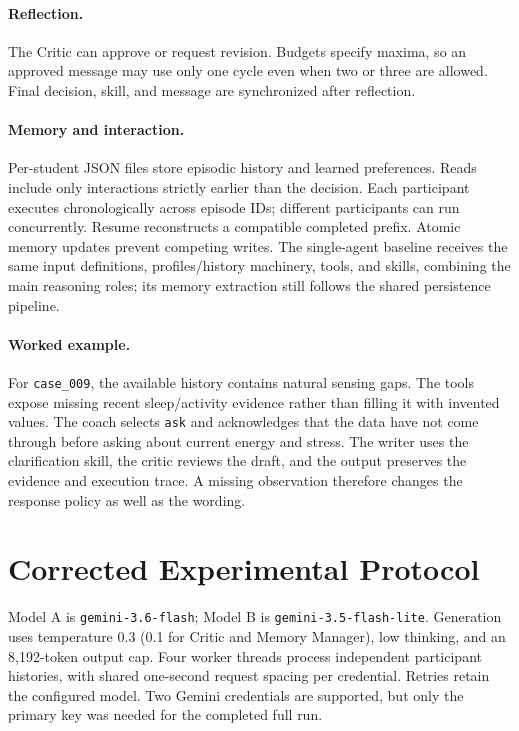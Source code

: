 \documentclass{article}
\begin{document}
\paragraph{Reflection.} The Critic can approve or request revision. Budgets specify maxima, so an approved message may use only one cycle even when two or three are allowed. Final decision, skill, and message are synchronized after reflection.
\paragraph{Memory and interaction.} Per-student JSON files store episodic history and learned preferences. Reads include only interactions strictly earlier than the decision. Each participant executes chronologically across episode IDs; different participants can run concurrently. Resume reconstructs a compatible completed prefix. Atomic memory updates prevent competing writes. The single-agent baseline receives the same input definitions, profiles/history machinery, tools, and skills, combining the main reasoning roles; its memory extraction still follows the shared persistence pipeline.

\paragraph{Worked example.} For \texttt{case\_009}, the available history contains natural sensing gaps. The tools expose missing recent sleep/activity evidence rather than filling it with invented values. The coach selects \texttt{ask} and acknowledges that the data have not come through before asking about current energy and stress. The writer uses the clarification skill, the critic reviews the draft, and the output preserves the evidence and execution trace. A missing observation therefore changes the response policy as well as the wording.

\section{Corrected Experimental Protocol}
Model A is \texttt{gemini-3.6-flash}; Model B is \texttt{gemini-3.5-flash-lite}. Generation uses temperature 0.3 (0.1 for Critic and Memory Manager), low thinking, and an 8,192-token output cap. Four worker threads process independent participant histories, with shared one-second request spacing per credential. Retries retain the configured model. Two Gemini credentials are supported, but only the primary key was needed for the completed full run.
\end{document}
